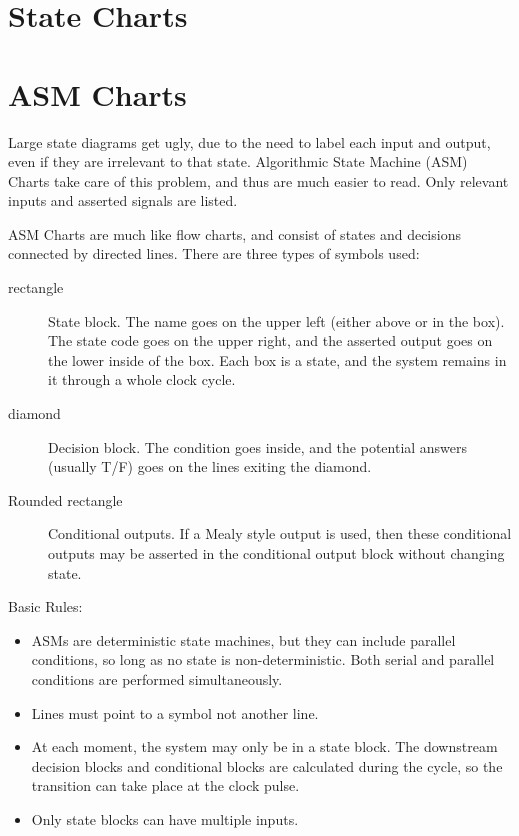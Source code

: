 \section{State Charts}


\section{ASM Charts}

Large state diagrams get ugly, due to the need to label each input and output, even if they are irrelevant to that state.  Algorithmic State Machine (ASM) Charts take care of this problem, and thus are much easier to read.  Only relevant inputs and asserted signals are listed.

ASM Charts are much like flow charts, and consist of states and decisions connected by directed lines. There are three types of symbols used:
\begin{description}
  \item[rectangle] State block.  The name goes on the upper left (either above or in the box).  The state code goes on the upper right, and the asserted output goes on the lower inside of the box.  Each box is a state, and the system remains in it through a whole clock cycle.
  \item[diamond] Decision block.  The condition goes inside, and the potential answers (usually T/F) goes on the lines exiting the diamond.
  \item[Rounded rectangle] Conditional outputs.  If a Mealy style output is used, then these conditional outputs may be asserted in the conditional output block without changing state.
\end{description}

Basic Rules:
\begin{itemize}
  \item ASMs are deterministic state machines, but they can include parallel conditions, so long as no state is non-deterministic.  Both serial and parallel conditions are performed simultaneously.
  \item Lines must point to a symbol not another line.
  \item At each moment, the system may only be in a state block.  The downstream decision blocks and conditional blocks are calculated during the cycle, so the transition can take place at the clock pulse.
  \item Only state blocks can have multiple inputs.
\end{itemize}

